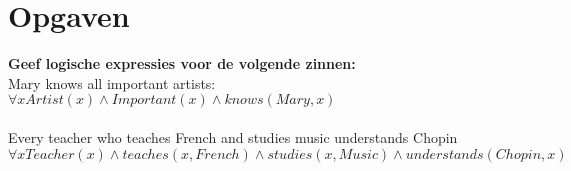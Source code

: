 \documentclass[12pt]{article}
\begin{document}
\maketitle

\section{Opgaven}

\textbf{Geef logische expressies voor de volgende zinnen:}\\
Mary knows all important artists:\\
$\forall xArtist(x) \wedge Important(x) \wedge knows(Mary, x)$\\
\\
Every teacher who teaches French and studies music understands Chopin\\
$\forall xTeacher(x) \wedge teaches(x, French) \wedge studies(x, Music) \wedge understands(Chopin, x)$
\end{document}
